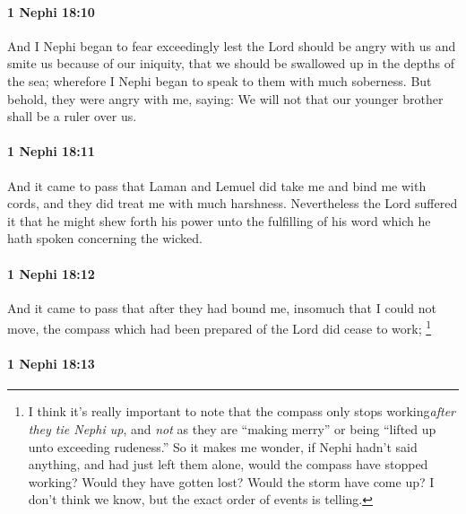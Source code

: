 		\paragraph{1 Nephi 18:10} %
			\label{1NEPHI-18-10}

			And I Nephi began to fear exceedingly lest the Lord should be angry with us
			and smite us because of our iniquity,
			that we should be swallowed up in the depths of the sea;
			wherefore I Nephi began to speak to them with much soberness.
			But behold, they were angry with me, saying:
			We will not that our younger brother shall be a ruler over us.

		\paragraph{1 Nephi 18:11} %
			\label{1NEPHI-18-11}

			And it came to pass that Laman and Lemuel did take me and bind me with cords,
			and they did treat me with much harshness.
			Nevertheless the Lord suffered it that he might shew forth his power
			unto the fulfilling of his word which he hath spoken concerning the wicked.

		\paragraph{1 Nephi 18:12} %
			\label{1NEPHI-18-12}

			And it came to pass that after they had bound me,
			insomuch that I could not move,
			the compass which had been prepared of the Lord did cease to work;%
				\footnote{%
					\label{1NEPHI-18-12-NOTE-cease}%
					I think it's really important to note that the compass only stops working\textit{after they tie Nephi up}, and \textit{not} as they are ``making merry'' or being ``lifted up unto exceeding rudeness.'' So it makes me wonder, if Nephi hadn't said anything, and had just left them alone, would the compass have stopped working? Would they have gotten lost? Would the storm have come up? I don't think we know, but the exact order of events is telling.
					}

		\paragraph{1 Nephi 18:13} %
			\label{1NEPHI-18-13}

